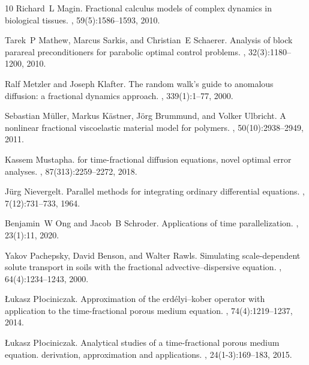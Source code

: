 \documentclass[12pt,a4paper]{article}
\begin{document}
\begin{thebibliography}{10}
	Richard~L Magin.
	\newblock Fractional calculus models of complex dynamics in biological tissues.
	, 59(5):1586--1593,
	2010.
	
	Tarek~P Mathew, Marcus Sarkis, and Christian~E Schaerer.
	\newblock Analysis of block parareal preconditioners for parabolic optimal
	control problems.
	, 32(3):1180--1200, 2010.
	
	Ralf Metzler and Joseph Klafter.
	\newblock The random walk's guide to anomalous diffusion: a fractional dynamics
	approach.
	, 339(1):1--77, 2000.
	
	Sebastian M{\"u}ller, Markus K{\"a}stner, J{\"o}rg Brummund, and Volker
	Ulbricht.
	\newblock A nonlinear fractional viscoelastic material model for polymers.
	, 50(10):2938--2949, 2011.
	
	Kassem Mustapha.
	 for time-fractional diffusion equations, novel optimal error
	analyses.
	, 87(313):2259--2272, 2018.
	
	J{\"u}rg Nievergelt.
	\newblock Parallel methods for integrating ordinary differential equations.
	, 7(12):731--733, 1964.
	
	Benjamin~W Ong and Jacob~B Schroder.
	\newblock Applications of time parallelization.
	, 23(1):11, 2020.
	
	Yakov Pachepsky, David Benson, and Walter Rawls.
	\newblock Simulating scale-dependent solute transport in soils with the
	fractional advective--dispersive equation.
	, 64(4):1234--1243,
	2000.
	
	{\L}ukasz P{\l}ociniczak.
	\newblock Approximation of the erd{\'e}lyi--kober operator with application to
	the time-fractional porous medium equation.
	, 74(4):1219--1237, 2014.
	
	{\L}ukasz P{\l}ociniczak.
	\newblock Analytical studies of a time-fractional porous medium equation.
	derivation, approximation and applications.
	,
	24(1-3):169--183, 2015.
	

\end{thebibliography}
\end{document}
